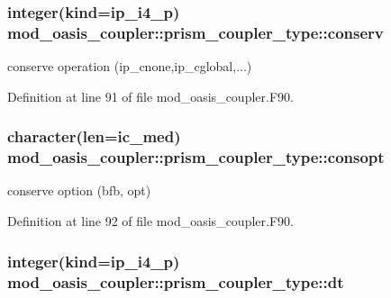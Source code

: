 \hypertarget{structmod__oasis__coupler_1_1prism__coupler__type_a6ae875acb2785153668c3e773ed9682f}{
\subsubsection[{conserv}]{\setlength{\rightskip}{0pt plus 5cm}integer(kind=ip\+\_\+i4\+\_\+p) mod\+\_\+oasis\+\_\+coupler\+::prism\+\_\+coupler\+\_\+type\+::conserv\hspace{0.3cm}{\ttfamily [private]}}}\label{structmod__oasis__coupler_1_1prism__coupler__type_a6ae875acb2785153668c3e773ed9682f}


conserve operation (ip\+\_\+cnone,ip\+\_\+cglobal,...) 



Definition at line 91 of file mod\+\_\+oasis\+\_\+coupler.\+F90.

\hypertarget{structmod__oasis__coupler_1_1prism__coupler__type_ab539821ab680aa56c81cb541c093f50f}{
\subsubsection[{consopt}]{\setlength{\rightskip}{0pt plus 5cm}character(len=ic\+\_\+med) mod\+\_\+oasis\+\_\+coupler\+::prism\+\_\+coupler\+\_\+type\+::consopt\hspace{0.3cm}{\ttfamily [private]}}}\label{structmod__oasis__coupler_1_1prism__coupler__type_ab539821ab680aa56c81cb541c093f50f}


conserve option (bfb, opt) 



Definition at line 92 of file mod\+\_\+oasis\+\_\+coupler.\+F90.

\hypertarget{structmod__oasis__coupler_1_1prism__coupler__type_ae1c1191f9aa4664aac2b819d1648320d}{
\subsubsection[{dt}]{\setlength{\rightskip}{0pt plus 5cm}integer(kind=ip\+\_\+i4\+\_\+p) mod\+\_\+oasis\+\_\+coupler\+::prism\+\_\+coupler\+\_\+type\+::dt\hspace{0.3cm}{\ttfamily [private]}}}\label{structmod__oasis__coupler_1_1prism__coupler__type_ae1c1191f9aa4664aac2b819d1648320d}


